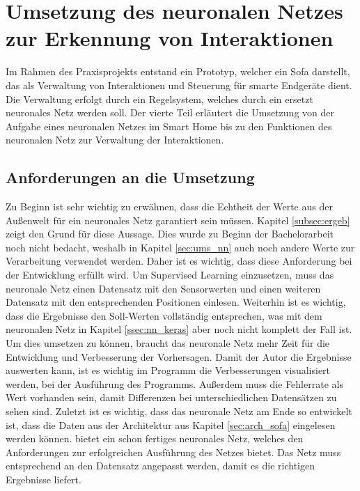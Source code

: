 \chapter{Umsetzung des neuronalen Netzes zur Erkennung von Interaktionen}
Im Rahmen des Praxisprojekts entstand ein Prototyp, welcher ein Sofa darstellt, das als Verwaltung von Interaktionen und Steuerung für smarte Endgeräte dient. Die Verwaltung erfolgt durch ein Regelsystem, welches durch ein ersetzt neuronales Netz werden soll. Der vierte Teil erläutert die Umsetzung von der Aufgabe eines neuronalen Netzes im Smart Home bis zu den Funktionen des neuronalen Netz zur Verwaltung der Interaktionen.

\section{Anforderungen an die Umsetzung}
Zu Beginn ist sehr wichtig zu erwähnen, dass die Echtheit der Werte aus der Außenwelt für ein neuronales Netz garantiert sein müssen. Kapitel \ref{subsec:ergeb} zeigt den Grund für diese Aussage. Dies wurde zu Beginn der Bachelorarbeit noch nicht bedacht, weshalb in Kapitel \ref{sec:ums_nn} auch noch andere Werte zur Verarbeitung verwendet werden. Daher ist es wichtig, dass diese Anforderung bei der Entwicklung erfüllt wird. Um Supervised Learning einzusetzen, muss das neuronale Netz einen Datensatz mit den Sensorwerten und einen weiteren Datensatz mit den entsprechenden Positionen einlesen. Weiterhin ist es wichtig, dass die Ergebnisse den Soll-Werten vollständig entsprechen, was mit dem neuronalen Netz in Kapitel \ref{ssec:nn_keras} aber noch nicht komplett der Fall ist. Um dies umsetzen zu können, braucht das neuronale Netz mehr Zeit für die Entwicklung und Verbesserung der Vorhersagen. Damit der Autor die Ergebnisse auswerten kann, ist es wichtig im Programm die Verbesserungen visualisiert werden, bei der Ausführung des Programms. Außerdem muss die Fehlerrate als Wert vorhanden sein, damit Differenzen bei unterschiedlichen Datensätzen zu sehen sind. Zuletzt ist es wichtig, dass das neuronale Netz am Ende so entwickelt ist, dass die Daten aus der Architektur aus Kapitel \ref{sec:arch_sofa} eingelesen werden können. \citep{frochte2018} bietet ein schon fertiges neuronales Netz, welches den Anforderungen zur erfolgreichen Ausführung des Netzes bietet. Das Netz muss entsprechend an den Datensatz angepasst werden, damit es die richtigen Ergebnisse liefert.

